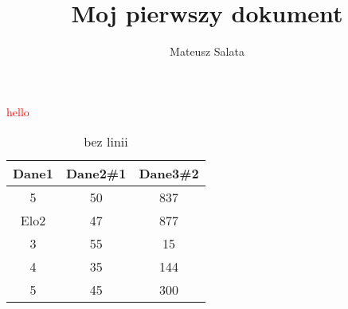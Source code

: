 \documentclass{article}
\title{Moj pierwszy dokument}
\author{Mateusz Salata}
\date{}
\begin{document}
\maketitle
 \textcolor{red}{ hello}

\begin{table}[ht]
	\caption{bez linii} 
	\centering 
	\begin{tabular}{c c c} 
	\hline 
	\color{blue}Dane1 & Dane2\#1 & Dane3\#2 \\ [0.5ex] 
	\hline 
	5 & 50 & 837 \\ 
	\textsf {Elo2}  & 47 & 877 \\
	3 & 55 & 15 \\
	4 & 35 & 144  \\
	5 & 45 & 300  \\ [1ex]
\hline 
\end{tabular}
\label{table:nonlin}
\end{table}


\end{document}
